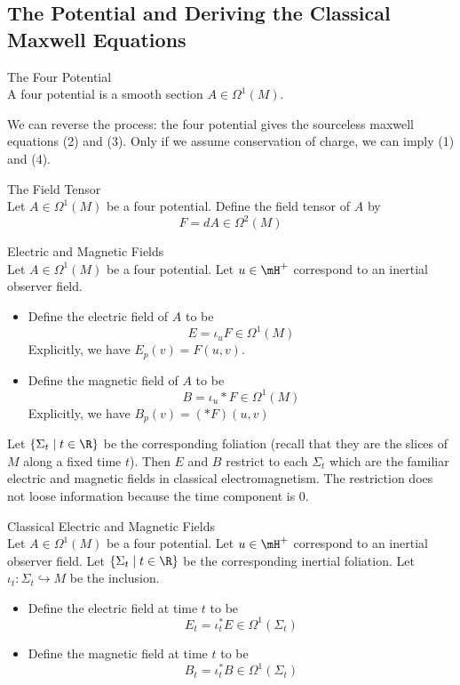 \documentclass[a4paper]{article}
\begin{document}
\subsection{The Potential and Deriving the Classical Maxwell Equations}
\begin{defn}{The Four Potential}{}\\
A four potential is a smooth section $A\in\Omega^1(M)$. 
\end{defn}

We can reverse the process: the four potential gives the sourceless maxwell equations (2) and (3). Only if we assume conservation of charge, we can imply (1) and (4). 

\begin{defn}{The Field Tensor}{}\\
Let $A\in\Omega^1(M)$ be a four potential. Define the field tensor of $A$ by $$F=dA\in\Omega^2(M)$$
\end{defn}

\begin{defn}{Electric and Magnetic Fields}{}\\
Let $A\in\Omega^1(M)$ be a four potential. Let $u\in\mH^+$ correspond to an inertial observer field. 
\begin{itemize}
\item Define the electric field of $A$ to be $$E=\iota_uF\in\Omega^1(M)$$ Explicitly, we have $E_p(v)=F(u,v)$. 
\item Define the magnetic field of $A$ to be $$B=\iota_u\ast F\in\Omega^1(M)$$ Explicitly, we have $B_p(v)=(\ast F)(u,v)$
\end{itemize}
\end{defn}

Let $\{\Sigma_t\;|\;t\in\R\}$ be the corresponding foliation (recall that they are the slices of $M$ along a fixed time $t$). Then $E$ and $B$ restrict to each $\Sigma_t$ which are the familiar electric and magnetic fields in classical electromagnetism. The restriction does not loose information because the time component is $0$. 

\begin{defn}{Classical Electric and Magnetic Fields}{}\\
Let $A\in\Omega^1(M)$ be a four potential. Let $u\in\mH^+$ correspond to an inertial observer field. Let $\{\Sigma_t\;|\;t\in\R\}$ be the corresponding inertial foliation. Let $\iota_t:\Sigma_t\hookrightarrow M$ be the inclusion. 
\begin{itemize}
\item Define the electric field at time $t$ to be $$E_t=\iota_t^\ast E\in\Omega^1(\Sigma_t)$$
\item Define the magnetic field at time $t$ to be $$B_t=\iota_t^\ast B\in\Omega^1(\Sigma_t)$$
\end{itemize}
\end{defn}
\end{document}
